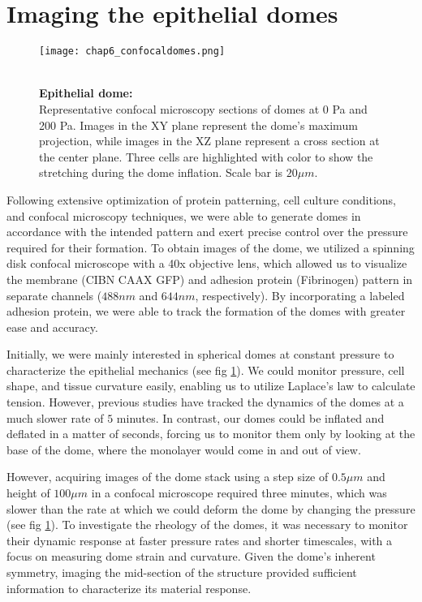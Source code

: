 \hypertarget{imaging-the-epithelial-domes}{%
\section{Imaging the epithelial
domes}\label{imaging-the-epithelial-domes}}

\begin{figure}
	\begin{minipage}[c]{0.6\textwidth}
		\texttt{[image: chap6\_confocaldomes.png]}
	\end{minipage}\hfill
	\begin{minipage}[c]{0.35\textwidth}
		\caption{\\ \textbf{Epithelial dome:}\\ Representative confocal microscopy sections of domes at 0 Pa and 200 Pa. Images in the XY plane represent the dome's maximum projection, while images in the XZ plane represent a cross section at the center plane. Three cells are highlighted with color to show the stretching during the dome inflation. Scale bar is $20 \mu m$.
		} \label{fig_6_6}
	\end{minipage}
\end{figure}

Following extensive optimization of protein patterning, cell culture conditions, and confocal microscopy techniques, we were able to generate domes in accordance with the intended pattern and exert precise control over the pressure required for their formation. To obtain images of the dome, we utilized a spinning disk confocal microscope with a 40x objective lens, which allowed us to visualize the membrane (CIBN CAAX GFP) and adhesion protein (Fibrinogen) pattern in separate channels ($488nm$ and $644nm$, respectively). By incorporating a labeled adhesion protein, we were able to track the formation of the domes with greater ease and accuracy.

Initially, we were mainly interested in spherical domes at constant pressure to characterize the epithelial mechanics (see fig \ref{fig_6_6}). We could monitor pressure, cell shape, and tissue curvature easily, enabling us to utilize Laplace's law to calculate tension. However, previous studies have tracked the dynamics of the domes at a much slower rate of $5$ minutes. In contrast, our domes could be inflated and deflated in a matter of seconds, forcing us to monitor them only by looking at the base of the dome, where the monolayer would come in and out of view.  

However, acquiring images of the dome stack using a step size of $0.5\mu m$ and height of $100 \mu m$ in a confocal microscope required three minutes, which was slower than the rate at which we could deform the dome by changing the pressure (see fig \ref{fig_6_6}). To investigate the rheology of the domes, it was necessary to monitor their dynamic response at faster pressure rates and shorter timescales, with a focus on measuring dome strain and curvature. Given the dome's inherent symmetry, imaging the mid-section of the structure provided sufficient information to characterize its material response.


